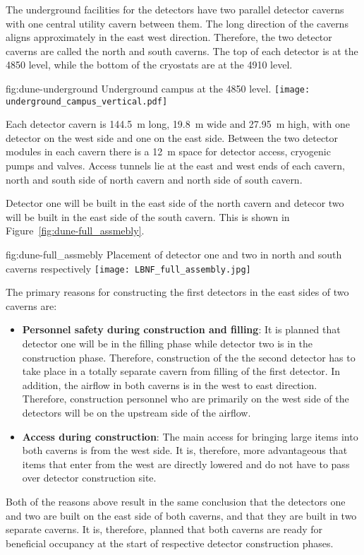The underground facilities for the  detectors have two parallel
detector caverns with one central utility cavern between them. The
long direction of the caverns aligns approximately in the 
east west direction. Therefore, the two detector caverns are called the north
and south caverns.  The top of each detector is at the 4850 level, while the bottom of the cryostats are at the 4910 level.
\begin{dunefigure}{fig:dune-underground}
  {Underground campus at the 4850 level.}
  \texttt{[image: underground\_campus\_vertical.pdf]}
\end{dunefigure}
Each detector cavern is \SI{144.5}{\meter} long, \SI{19.8}{\meter}
wide and \SI{27.95}{\meter} high, with one detector on the west side
and one on the east side. Between the two detector modules in each
cavern there is a \SI{12}{\meter} space for detector access, cryogenic pumps and valves.
Access tunnels lie at the east and
west ends of each cavern, north and south side of north cavern and
north side of south cavern.

Detector one will be built in the east side of the north cavern and
detecor two will be built in the east side of the south cavern. This
is shown in Figure~\ref{fig:dune-full_assmebly}.
\begin{dunefigure}{fig:dune-full_assmebly}
  {Placement of detector one and two in north and south caverns respectively}
  \texttt{[image: LBNF\_full\_assembly.jpg]}
\end{dunefigure}
The primary reasons for constructing the first detectors in the east sides of two caverns are:
\begin{itemize}
\item {\bf Personnel safety during construction and filling}: It is
  planned that detector one will be in the filling phase while detector
  two is in the construction phase. Therefore, construction of the the
  second detector has to take place in a totally separate cavern from
  filling of the first detector. In addition, the airflow in both
  caverns is in the west to east direction. Therefore, construction
  personnel who are primarily on the west side of the detectors will
  be on the upstream side of the airflow.
\item{\bf Access during construction}: The main access for bringing
  large items into both caverns is from the west side. It is,
  therefore, more advantageous that items that enter from the west are
  directly lowered and do not have to pass over detector construction
  site.
\end{itemize}
Both of the reasons above result in the same conclusion that the
detectors one and two are built on the east side of both caverns, and
that they are built in two separate caverns. It is, therefore, planned
that both caverns are ready for beneficial occupancy at the start of
respective detector construction phases.

